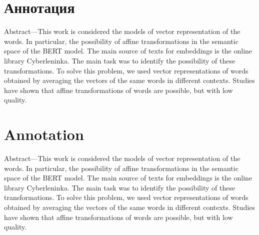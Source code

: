 \documentclass[a4paper,14pt]{article}
\begin{document}


\section*{Аннотация}


Abstract—This work is considered the models of vector representation of the words. In particular, the possibility of affine transformations in the semantic space of the BERT model. The main source of texts for embeddings is the online library Cyberleninka. The main task was to identify the possibility of these transformations. To solve this problem, we used vector representations of words obtained by averaging the vectors of the same words in different contexts. Studies have shown that affine transformations of words are possible, but with low quality.


\section*{Annotation}


Abstract—This work is considered the models of vector representation of the words. In particular, the possibility of affine transformations in the semantic space of the BERT model. The main source of texts for embeddings is the online library Cyberleninka. The main task was to identify the possibility of these transformations. To solve this problem, we used vector representations of words obtained by averaging the vectors of the same words in different contexts. Studies have shown that affine transformations of words are possible, but with low quality.
\end{document}

